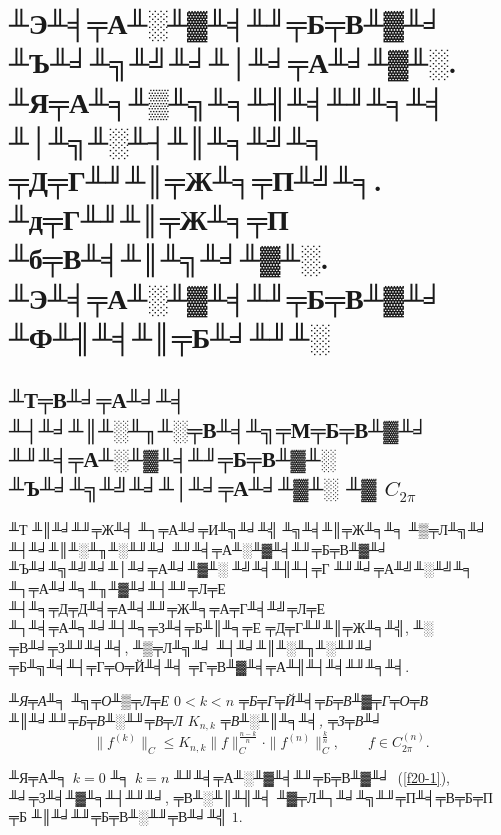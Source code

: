 
\chapter{╨Э╨╡╤А╨░╨▓╨╡╨╜╤Б╤В╨▓╨╛ ╨Ъ╨╛╨╗╨╝╨╛╨│╨╛╤А╨╛╨▓╨░.\\
╨Я╤А╨╕╨▒╨╗╨╕╨╢╨╡╨╜╨╕╨╡ ╨│╨╗╨░╨┤╨║╨╕╨╝╨╕ ╤Д╤Г╨╜╨║╤Ж╨╕╤П╨╝╨╕.\\ ╨д╤Г╨╜╨║╤Ж╨╕╤П ╨б╤В╨╡╨║╨╗╨╛╨▓╨░.\\
╨Э╨╡╤А╨░╨▓╨╡╨╜╤Б╤В╨▓╨╛ ╨Ф╨╢╨╡╨║╤Б╨╛╨╜╨░}

\section{╨Т╤В╨╛╤А╨╛╨╡ ╨┤╨╛╨║╨░╨╖╨░╤В╨╡╨╗╤М╤Б╤В╨▓╨╛ ╨╜╨╡╤А╨░╨▓╨╡╨╜╤Б╤В╨▓╨░ ╨Ъ╨╛╨╗╨╝╨╛╨│╨╛╤А╨╛╨▓╨░ ╨▓ $C_{2\pi}$}


 ╨Т ╨║╨╛╨╜╤Ж╨╡ ╨┐╤А╨╛╤И╨╗╨╛╨╣ ╨╗╨╡╨║╤Ж╨╕╨╕ ╨▒╤Л╨╗╨╛ ╨┤╨╛╨║╨░╨╖╨░╨╜╨╛ ╨╜╨╡╤А╨░╨▓╨╡╨╜╤Б╤В╨▓╨╛ ╨Ъ╨╛╨╗╨╝╨╛╨│╨╛╤А╨╛╨▓╨░ ╨╝╨╡╨╢╨┤╤Г ╨╜╨╛╤А╨╝╨░╨╝╨╕
 ╨┐╤А╨╛╨╕╨╖╨▓╨╛╨┤╨╜╤Л╤Е ╨┤╨╕╤Д╤Д╨╡╤А╨╡╨╜╤Ж╨╕╤А╤Г╨╡╨╝╤Л╤Е ╨┐╨╡╤А╨╕╨╛╨┤╨╕╤З╨╡╤Б╨║╨╕╤Е ╤Д╤Г╨╜╨║╤Ж╨╕╨╣, ╨░ ╤В╨╛╤З╨╜╨╡╨╡, ╨▒╤Л╨╗╨╛ ╨┤╨╛╨║╨░╨╖╨░╨╜╨╛
 ╤Б╨╗╨╡╨┤╤Г╤О╤Й╨╡╨╡ ╤Г╤В╨▓╨╡╤А╨╢╨┤╨╡╨╜╨╕╨╡.

 {\it ╨Я╤А╨╕ ╨╗╤О╨▒╤Л╤Е $0<k<n$ ╤Б╤Г╤Й╨╡╤Б╤В╨▓╤Г╤О╤В ╨║╨╛╨╜╤Б╤В╨░╨╜╤В╤Л $K_{n,k}$ ╤В╨░╨║╨╕╨╡, ╤З╤В╨╛
  \begin{equation}\label{f20-1}
 \|f^{(k)}\|_C\le K_{n,k}\|f\|^{\frac{n-k}{n}}_C\cdot
 \|f^{(n)}\|^{\frac{k}{n}}_C,\qquad f\in C^{(n)}_{{2\pi}}.
 \end{equation}
 }

 ╨Я╤А╨╕ $k=0$ ╨╕ $k=n$ ╨╜╨╡╤А╨░╨▓╨╡╨╜╤Б╤В╨▓╨╛~(\ref{f20-1}), ╨╛╤З╨╡╨▓╨╕╨┤╨╜╨╛, {╤В╨░╨║╨╢╨╡}
 ╨▓╤Л╨┐╨╛╨╗╨╜╤П╨╡╤В╤Б╤П {╤Б} {╨║╨╛╨╜╤Б╤В╨░╨╜╤В╨╛╨╣ $1$}.


